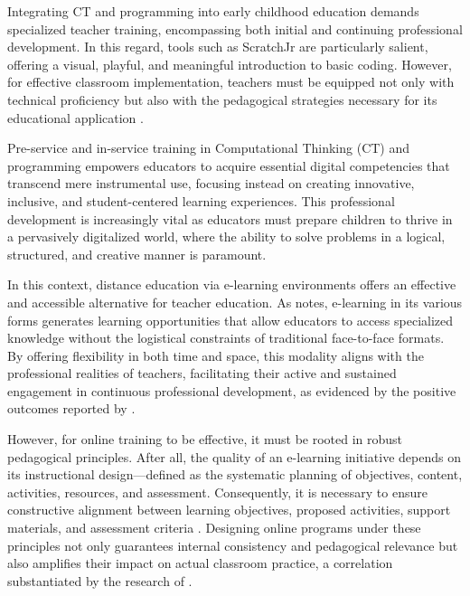 \documentclass[english]{textolivre}
\begin{document}
Integrating CT and programming into early childhood education demands specialized teacher training, encompassing both initial and continuing professional development. In this regard, tools such as ScratchJr are particularly salient, offering a visual, playful, and meaningful introduction to basic coding. However, for effective classroom implementation, teachers must be equipped not only with technical proficiency but also with the pedagogical strategies necessary for its educational application \cite{bers2018scratchjr,mirandapinto2022scratchjr}.

Pre-service and in-service training in Computational Thinking (CT) and programming empowers educators to acquire essential digital competencies that transcend mere instrumental use, focusing instead on creating innovative, inclusive, and student-centered learning experiences. This professional development is increasingly vital as educators must prepare children to thrive in a pervasively digitalized world, where the ability to solve problems in a logical, structured, and creative manner is paramount.

In this context, distance education via e-learning environments offers an effective and accessible alternative for teacher education. As \textcite{ibanez2018aspectos} notes, e-learning in its various forms generates learning opportunities that allow educators to access specialized knowledge without the logistical constraints of traditional face-to-face formats. By offering flexibility in both time and space, this modality aligns with the professional realities of teachers, facilitating their active and sustained engagement in continuous professional development, as evidenced by the positive outcomes reported by \textcite{amante2019computational,amante2023designing,souza2020evaluation}.

However, for online training to be effective, it must be rooted in robust pedagogical principles. After all, the quality of an e-learning initiative depends on its instructional design—defined as the systematic planning of objectives, content, activities, resources, and assessment. Consequently, it is necessary to ensure constructive alignment between learning objectives, proposed activities, support materials, and assessment criteria \cite{hadi2017development}. Designing online programs under these principles not only guarantees internal consistency and pedagogical relevance but also amplifies their impact on actual classroom practice, a correlation substantiated by the research of \textcite{quintas2022learning,amante2023designing}.
\end{document}
